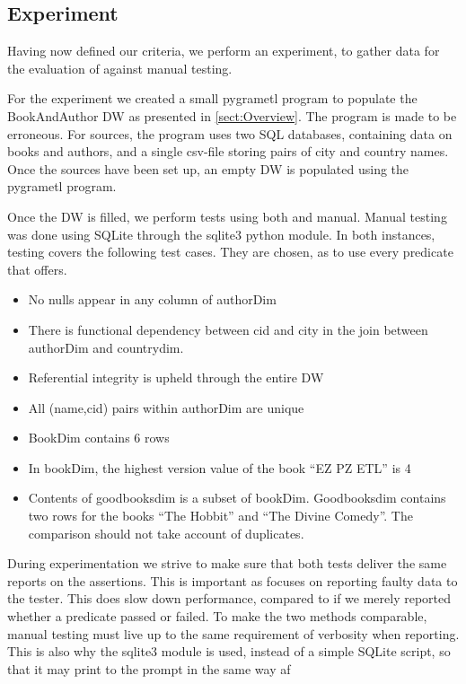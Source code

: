 \subsection{Experiment}
Having now defined our criteria, we perform an experiment, to gather data for the evaluation of \FW{} against manual testing.

For the experiment we created a small pygrametl program to populate the BookAndAuthor DW as presented in \cref{sect:Overview}. The program is made to be erroneous. For sources, the program uses two SQL databases, containing data on books and authors, and a single csv-file storing pairs of city and country names.  Once the sources have been set up, an empty DW is populated using the pygrametl program.

Once the DW is filled, we perform tests using both \FW{} and manual.  Manual testing was done using SQLite through the sqlite3 python module. In both instances, testing covers the following test cases. They are chosen, as to use every predicate that \FW{} offers.

\begin{itemize}
\item No nulls appear in any column of authorDim
\item There is functional dependency between cid and city in the join between authorDim and countrydim.
\item Referential integrity is upheld through the entire DW
\item All (name,cid) pairs within authorDim are unique
\item BookDim contains 6 rows
\item In bookDim, the highest version value of the book “EZ PZ ETL” is 4
\item Contents of goodbooksdim is a subset of bookDim. Goodbooksdim contains two rows for the books “The Hobbit” and “The Divine Comedy”. The comparison should not take account of duplicates.
\end{itemize}

During experimentation we strive to make sure that both tests deliver the same reports on the assertions.  This is important as \FW{} focuses on reporting faulty data to the tester. This does slow down performance, compared to if we merely reported whether a predicate passed or failed. To make the two methods comparable, manual testing must live up to the same requirement of verbosity when reporting. This is also why the sqlite3 module is used, instead of a simple SQLite script, so that it may print to the prompt in the same way af \FW{}

